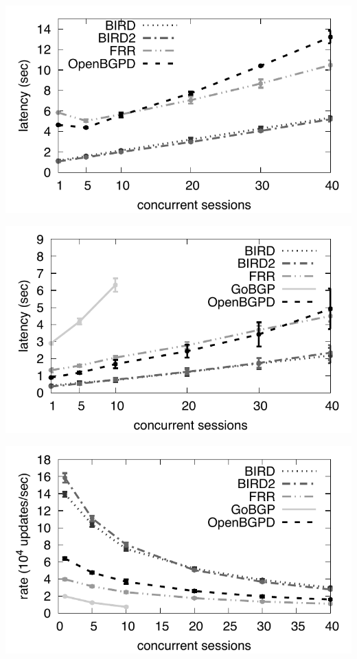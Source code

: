 \begin{minipage}[c]{.49\linewidth}
	\centering
	\includegraphics[width=\linewidth]{images/table-transfer-scalability.pdf}
	\label{fig:tbl-transfer-scalability}
\end{minipage}
\begin{minipage}[c]{.49\linewidth}
	\centering
	\includegraphics[width=\linewidth]{images/ssbt-scalability.pdf}
	 \label{fig:ssbt-scalability}
\end{minipage}
\hfill
\begin{minipage}[c]{.49\linewidth}
	\centering
	\includegraphics[width=\linewidth]{images/ssrt-scalability.pdf}
	\label{fig:ssrt-scalability}
\end{minipage}
